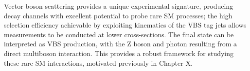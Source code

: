 
Vector-boson scattering provides a unique experimental signature, producing
decay channels with excellent potential to probe rare \ac{SM} processes; the
high selection efficiency achievable by exploiting kinematics of the \ac{VBS}
tag jets allows measurements to be conducted at lower cross-sections.
%
The \Zyjj final state can be interpreted as \ac{VBS} \Zy production, with the Z
boson and photon resulting from a direct multiboson interaction. This provides a
robust framework for studying these rare \ac{SM} interactions, motivated
previously in Chapter X.%

